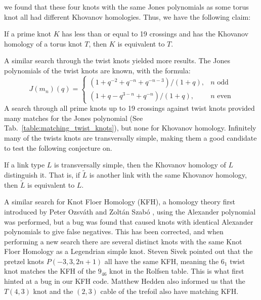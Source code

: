     we found that these four knots with the same Jones polynomials as some
    torus knot all had different Khovanov homologies. Thus, we have the
    following claim:
    \begin{theorem}
        If a prime knot $K$ has less than or equal to 19 crossings and has
        the Khovanov homology of a torus knot $T$,
        then $K$ is equivalent to $T$.
    \end{theorem}
    A similar search through the twist knots yielded more results.
    The Jones polynomials of the twist knots are known, with the formula:
    \begin{equation}
        J(m_{n})(q)=
        \begin{cases}
            (1+q^{-2}+q^{-n}+q^{-n-3})/(1+q),&n\textrm{ odd}\\
            (1+q-q^{3-n}+q^{-n})/(1+q),&n\textrm{ even}
        \end{cases}
    \end{equation}
    A search through all prime knots up to 19 crossings against twist knots
    provided many matches for the Jones polynomial
    (See Tab.~\ref{table:matching_twist_knots}), but
    none for Khovanov homology. Infinitely many of the twists knots are
    transversally simple, making them a good candidate to test the following
    conjecture on.
    \begin{conjecture}
        If a link type $L$ is transversally simple, then the Khovanov
        homology of $L$ distinguish it. That is, if $\tilde{L}$
        is another link with the same Khovanov homology, then $\tilde{L}$ is
        equivalent to $L$.
    \end{conjecture}
    A similar search for Knot Floer Homology (KFH), a homology theory
    first introduced by Peter Ozsv\'{a}th and Zolt\'{a}n Szab\'{o}
    \cite{ozsvathszabo2004}, using the Alexander polynomial
    was performed, but a bug was found that caused knots with identical
    Alexander polynomials to give false negatives. This has been corrected,
    and when performing a new search there are several distinct knots
    with the same Knot Floer Homology as a Legendrian simple knot. Steven
    Sivek pointed
    out that the pretzel knots $P(-3,3,2n+1)$ all have the same KFH, meaning
    the $6_{1}$ twist knot matches the KFH of the $9_{46}$ knot in the
    Rolfsen table. This is what first hinted at a bug in our KFH code.
    Matthew Hedden also informed us that the $T(4,3)$ knot and the
    $(2,3)$ cable of the trefoil also have matching KFH.
